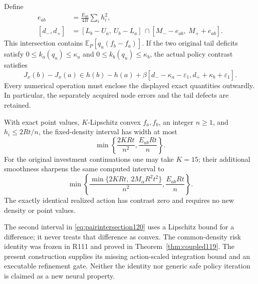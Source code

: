 \begin{theorem}
\label{thm:paired120}
Define
\begin{align}
 e_{ab}&=\frac{E_{ab}}{4B}\sum_i h_i^2,\label{eq:pairradius120}\\
 [d_-,d_+]&=[L_b-U_a,\ U_b-L_a]\,
                  \cap[M_--e_{ab},\ M_++e_{ab}].
 \label{eq:pairintersection120}
\end{align}
This intersection contains $\mathbb E_P[q_u(f_b-f_a)]$.
If the two original tail deficits satisfy
$0\le k_a(q_u)\le\kappa_a$ and
$0\le k_b(q_u)\le\kappa_b$, the actual policy contrast satisfies
\begin{equation}\label{eq:policycontrast120}
 J_x(b)-J_x(a)\in h(b)-h(a)
       +\beta[d_--\kappa_a-\varepsilon_1,
                     d_++\kappa_b+\varepsilon_1].
\end{equation}
Every numerical operation must enclose the displayed exact quantities
outwardly.  In particular, the separately acquired node errors and
the tail defects are retained.

With exact point values, $K$-Lipschitz convex $f_a,f_b$, an
integer $n\ge1$, and $h_i\le2Rt/n$, the fixed-density interval
has width at most
\begin{equation}\label{eq:mixedwidth120}
 \min\left\{\frac{2KRt}{n^2},
                   \frac{E_{ab}Rt}{n}\right\}.
\end{equation}
For the original investment continuations one may take $K=15$;
their additional smoothness sharpens the same computed interval to
\begin{equation}\label{eq:smoothpairwidth120}
 \min\left\{
   \frac{\min\{2KRt,\ 2M_\alpha R^2t^2\}}{n^2},
   \frac{E_{ab}Rt}{n}\right\}.
\end{equation}
The exactly identical realized action has contrast zero and requires
no new density or point values.
\end{theorem}

The second interval in \eqref{eq:pairintersection120} uses a Lipschitz
bound for a difference; it never treats that difference as convex.
The common-density risk identity was frozen in R111 and proved in
Theorem~\ref{thm:coupled119}.  The present construction supplies its
missing action-scaled integration bound and an executable refinement
gate.  Neither the identity nor generic safe policy iteration is claimed
as a new neural property.

